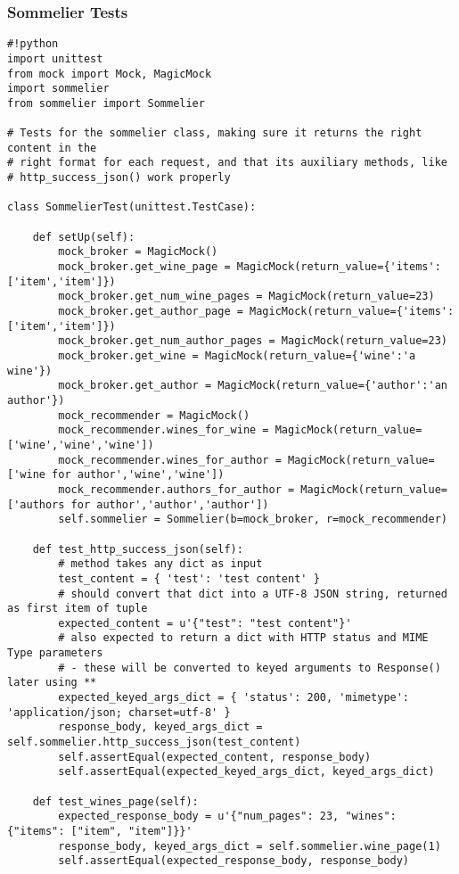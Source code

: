 \subsubsection{Sommelier Tests}

\begin{verbatim}
#!python
import unittest
from mock import Mock, MagicMock
import sommelier 
from sommelier import Sommelier

# Tests for the sommelier class, making sure it returns the right content in the 
# right format for each request, and that its auxiliary methods, like
# http_success_json() work properly

class SommelierTest(unittest.TestCase):

    def setUp(self):
        mock_broker = MagicMock()
        mock_broker.get_wine_page = MagicMock(return_value={'items':['item','item']})
        mock_broker.get_num_wine_pages = MagicMock(return_value=23)
        mock_broker.get_author_page = MagicMock(return_value={'items':['item','item']})
        mock_broker.get_num_author_pages = MagicMock(return_value=23)
        mock_broker.get_wine = MagicMock(return_value={'wine':'a wine'})
        mock_broker.get_author = MagicMock(return_value={'author':'an author'})
        mock_recommender = MagicMock()
        mock_recommender.wines_for_wine = MagicMock(return_value=['wine','wine','wine'])
        mock_recommender.wines_for_author = MagicMock(return_value=['wine for author','wine','wine'])
        mock_recommender.authors_for_author = MagicMock(return_value=['authors for author','author','author'])
        self.sommelier = Sommelier(b=mock_broker, r=mock_recommender)
 
    def test_http_success_json(self):
        # method takes any dict as input
        test_content = { 'test': 'test content' }
        # should convert that dict into a UTF-8 JSON string, returned as first item of tuple
        expected_content = u'{"test": "test content"}'
        # also expected to return a dict with HTTP status and MIME Type parameters
        # - these will be converted to keyed arguments to Response() later using **
        expected_keyed_args_dict = { 'status': 200, 'mimetype': 'application/json; charset=utf-8' }
        response_body, keyed_args_dict = self.sommelier.http_success_json(test_content)
        self.assertEqual(expected_content, response_body)
        self.assertEqual(expected_keyed_args_dict, keyed_args_dict)

    def test_wines_page(self):
        expected_response_body = u'{"num_pages": 23, "wines": {"items": ["item", "item"]}}'
        response_body, keyed_args_dict = self.sommelier.wine_page(1)
        self.assertEqual(expected_response_body, response_body)


\end{verbatim}
